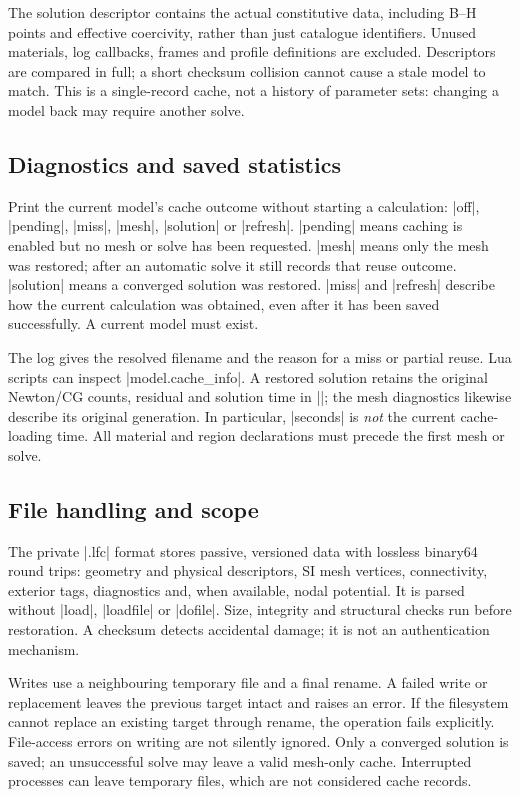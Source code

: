 The solution descriptor contains the actual constitutive data, including
B--H points and effective coercivity, rather than just catalogue identifiers.
Unused materials, log callbacks, frames and profile definitions are excluded.
Descriptors are compared in full; a short checksum collision cannot cause a
stale model to match. This is a single-record cache, not a history of parameter
sets: changing a model back may require another solve.

\subsection{Diagnostics and saved statistics}
\begin{command}{\femmcachestatus}
Print the current model's cache outcome without starting a calculation:
|off|, |pending|, |miss|, |mesh|, |solution| or |refresh|.
|pending| means caching is enabled but no mesh or solve has been requested.
|mesh| means only the mesh was restored; after an automatic solve it still
records that reuse outcome. |solution| means a converged solution was restored.
|miss| and |refresh| describe how the current calculation was obtained, even
after it has been saved successfully. A current model must exist.
\end{command}

The log gives the resolved filename and the reason for a miss or partial
reuse. Lua scripts can inspect |model.cache_info|. A restored solution
retains the original Newton/CG counts, residual and solution time in
|\femmstat|; the mesh diagnostics likewise describe its original generation.
In particular, |seconds| is \emph{not} the current cache-loading time.
All material and region declarations must precede the first mesh or solve.

\subsection{File handling and scope}
The private |.lfc| format stores passive, versioned data with lossless
binary64 round trips: geometry and physical descriptors, SI mesh vertices,
connectivity, exterior tags, diagnostics and, when available, nodal potential.
It is parsed without |load|, |loadfile| or |dofile|. Size, integrity and
structural checks run before restoration. A checksum detects accidental
damage; it is not an authentication mechanism.

Writes use a neighbouring temporary file and a final rename. A failed write
or replacement leaves the previous target intact and raises an error. If
the filesystem cannot replace an existing target through rename, the
operation fails explicitly. File-access errors on writing are not silently
ignored. Only a converged solution is saved; an unsuccessful solve may
leave a valid mesh-only cache. Interrupted processes can leave temporary
files, which are not considered cache records.

